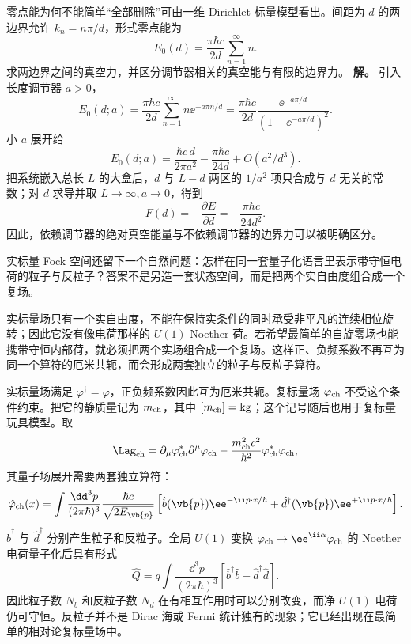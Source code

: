 \begin{exbox}[一维 Casimir 模型]
零点能为何不能简单“全部删除”可由一维 Dirichlet 标量模型看出。间距为 $d$ 的两边界允许 $k_n=n\pi/d$，形式零点能为
\begin{equation*}
E_0(d)=\frac{\pi\hbar c}{2d}\sum_{n=1}^\infty n.
\end{equation*}
求两边界之间的真空力，并区分调节器相关的真空能与有限的边界力。
\textbf{解。} 引入长度调节器 $a>0$，
\begin{equation*}
E_0(d;a)=\frac{\pi\hbar c}{2d}
\sum_{n=1}^\infty n \ee^{-a\pi n/d}
=\frac{\pi\hbar c}{2d}
\frac{\ee^{-a\pi/d}}{(1-\ee^{-a\pi/d})^2}.
\end{equation*}
小 $a$ 展开给
\begin{equation*}
E_0(d;a)=\frac{\hbar c\,d}{2\pi a^2}-\frac{\pi\hbar c}{24d}+O(a^2/d^3).
\end{equation*}
把系统嵌入总长 $L$ 的大盒后，$d$ 与 $L-d$ 两区的 $1/a^2$ 项只合成与 $d$ 无关的常数；对 $d$ 求导并取 $L\to\infty,a\to0$，得到
\begin{equation*}
F(d)=-\frac{\partial E}{\partial d}=-\frac{\pi\hbar c}{24d^2}.
\end{equation*}
因此，依赖调节器的绝对真空能量与不依赖调节器的边界力可以被明确区分。
\end{exbox}

实标量 Fock 空间还留下一个自然问题：怎样在同一套量子化语言里表示带守恒电荷的粒子与反粒子？答案不是另造一套状态空间，而是把两个实自由度组合成一个复场。

实标量场只有一个实自由度，不能在保持实条件的同时承受非平凡的连续相位旋转；因此它没有像电荷那样的 $U(1)$ Noether 荷。若希望最简单的自旋零场也能携带守恒内部荷，就必须把两个实场组合成一个复场。这样正、负频系数不再互为同一个算符的厄米共轭，而会形成两套独立的粒子与反粒子算符。

实标量场满足 $\varphi^\dagger=\varphi$，正负频系数因此互为厄米共轭。复标量场 $\varphi_{\rm ch}$ 不受这个条件约束。把它的静质量记为 $m_{\rm ch}$，其中 $[m_{\rm ch}]=\mathrm{kg}$；这个记号随后也用于复标量玩具模型。取
\begin{equation*}
 \Lag_{\rm ch}
 =\partial_\mu\varphi_{\rm ch}^*\partial^\mu\varphi_{\rm ch}
 -\frac{m_{\rm ch}^2c^2}{\hbar^2}\varphi_{\rm ch}^*\varphi_{\rm ch},
\end{equation*}
其量子场展开需要两套独立算符：
\begin{equation}
 \hat\varphi_{\rm ch}(x)=
 \int\frac{\dd^3 p}{(2\pi\hbar)^3}
 \frac{\hbar c}{\sqrt{2E_{\vb{p}}}}
 \left[
 \hat b(\vb{p})\ee^{-\ii p\cdot x/\hbar}
 +\hat d^\dagger(\vb{p})\ee^{+\ii p\cdot x/\hbar}
 \right].
 \label{eq:complex-scalar-exp-r2}
\end{equation}
$\hat b^\dagger$ 与 $\hat d^\dagger$ 分别产生粒子和反粒子。全局 $U(1)$ 变换 $\varphi_{\rm ch}\to \ee^{\ii\alpha}\varphi_{\rm ch}$ 的 Noether 电荷量子化后具有形式
\begin{equation}
 \hat Q=q\int\frac{\dd^3 p}{(2\pi\hbar)^3}
 \left[
 \hat b^\dagger\hat b-\hat d^\dagger\hat d
 \right].
 \label{eq:complex-scalar-charge-r2}
\end{equation}
因此粒子数 $N_b$ 和反粒子数 $N_d$ 在有相互作用时可以分别改变，而净 $U(1)$ 电荷仍可守恒。反粒子并不是 Dirac 海或 Fermi 统计独有的现象；它已经出现在最简单的相对论复标量场中。

